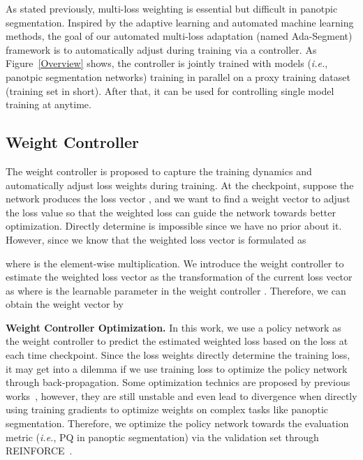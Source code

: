 \documentclass[letterpaper]{article} \usepackage{aaai21}  \usepackage{times}  \usepackage{helvet} \usepackage{courier}  \usepackage[hyphens]{url}  \usepackage{graphicx} \urlstyle{rm} \def\UrlFont{\rm}  \usepackage{natbib}  \usepackage{caption} \frenchspacing  \setlength{\pdfpagewidth}{8.5in}  \setlength{\pdfpageheight}{11in}
\begin{document}
 As stated previously, multi-loss weighting is essential but difficult in panotpic segmentation.
 Inspired by the adaptive learning and automated machine learning methods,
 the goal of our automated multi-loss adaptation (named Ada-Segment)
 framework is to automatically adjust  during training via a controller. 
 As Figure~\ref{Overview} shows, the controller is jointly trained 
 with  models (\textit{i.e.}, panotpic segmentation networks)  
 training in parallel on a proxy training dataset (training set in short).
 After that, it can be used for controlling single model training at anytime. 
 






 
 \subsection{Weight Controller}
 \label{sec:w-gen}
The weight controller is proposed to capture the training dynamics 
 and automatically adjust loss weights during training. 
At the  checkpoint, suppose the network produces the loss vector , 
 and we want to find a weight vector  to adjust the loss value 
 so that the weighted loss can guide the network towards better optimization. 
 Directly determine  is impossible since we have no prior about it. 
 However, since we know that the weighted loss vector is formulated as 
 
 where  is the element-wise multiplication. 
We introduce the weight controller to estimate the weighted loss vector as the 
 transformation of the current loss vector as 
where  is the learnable parameter in the weight controller . 
 Therefore, we can obtain the weight vector  by 
 

 \noindent
 \textbf{Weight Controller Optimization.}
 In this work, we use a policy network as the weight controller to predict the estimated weighted loss 
 based on the loss at each time checkpoint. 
Since the loss weights directly determine the training loss, it may get into a dilemma if we use 
 training loss to optimize the policy network through back-propagation. 
 Some optimization technics are proposed by previous works~\cite{kendall2018uncertainty,chen2017gradnorm}, 
 however, they are still unstable and even lead to divergence when 
 directly using training gradients to optimize weights on complex tasks like panoptic segmentation.
 Therefore, we optimize the policy network towards the evaluation metric 
 (\textit{i.e.}, PQ in panoptic segmentation) 
 via the validation set through REINFORCE~\cite{williams1992REINFORCE}.
\end{document}

